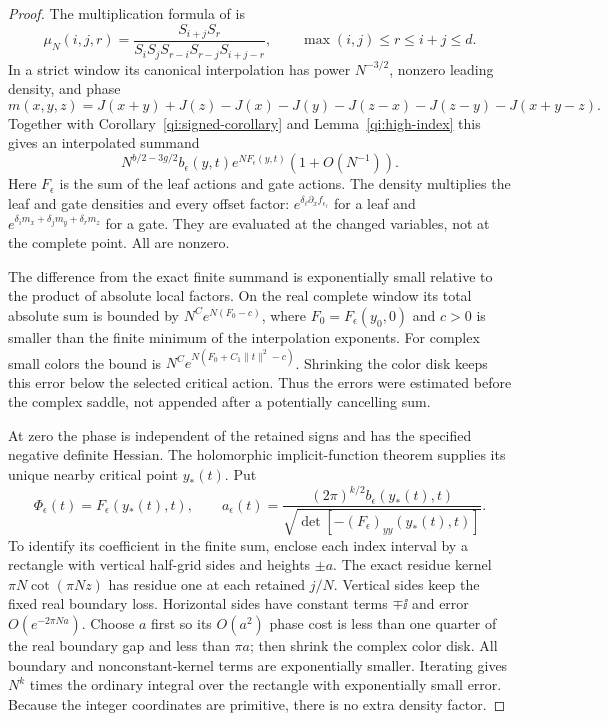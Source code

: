 \begin{proof}
The multiplication formula of \cite[Theorem 3.3]{Newton} is
\[
 \mu_N(i,j,r)=
 \frac{S_{i+j}S_r}{S_iS_jS_{r-i}S_{r-j}S_{i+j-r}},
 \qquad \max(i,j)\le r\le i+j\le d .
\]
In a strict window its canonical interpolation has power $N^{-3/2}$,
nonzero leading density, and phase
\[
 m(x,y,z)=J(x+y)+J(z)-J(x)-J(y)
                  -J(z-x)-J(z-y)-J(x+y-z).
\]
Together with Corollary~\ref{qi:signed-corollary} and
Lemma~\ref{qi:high-index} this gives an interpolated summand
\[
 N^{b/2-3g/2}b_\epsilon(y,t)e^{NF_\epsilon(y,t)}
                         (1+O(N^{-1})).
\]
Here $F_\epsilon$ is the sum of the leaf actions and gate actions. The density multiplies the leaf and gate densities and every offset factor:
$e^{\delta_\ell\partial_xf_{\epsilon_\ell}}$ for a leaf and
$e^{\delta_i m_x+\delta_j m_y+\delta_r m_z}$ for a gate.
They are evaluated at the changed variables, not at the complete point. All are nonzero.

The difference from the exact finite summand is exponentially small relative to the product of absolute local factors. On the real complete window its total absolute sum is bounded by
$N^C e^{N(F_0-c)}$, where $F_0=F_\epsilon(y_0,0)$ and $c>0$ is smaller than the finite minimum of the interpolation exponents. For complex small colors the bound is
$N^C e^{N(F_0+C_1\|t\|^2-c)}$.
Shrinking the color disk keeps this error below the selected critical action. Thus the errors were estimated before the complex saddle, not appended after a potentially cancelling sum.

At zero the phase is independent of the retained signs and has the specified negative definite Hessian. The holomorphic implicit-function theorem supplies its unique nearby critical point $y_*(t)$. Put
\[
 \Phi_\epsilon(t)=F_\epsilon(y_*(t),t),\qquad
 a_\epsilon(t)=
 \frac{(2\pi)^{k/2}b_\epsilon(y_*(t),t)}
 {\sqrt{\det[-(F_\epsilon)_{yy}(y_*(t),t)]}}.
\]
To identify its coefficient in the finite sum, enclose each index interval by a rectangle with vertical half-grid sides and heights $\pm a$. The exact residue kernel $\pi N\cot(\pi Nz)$ has residue one at each retained $j/N$. Vertical sides keep the fixed real boundary loss. Horizontal sides have constant terms $\mp\ii$ and error $O(e^{-2\pi Na})$. Choose $a$ first so its $O(a^2)$ phase cost is less than one quarter of the real boundary gap and less than $\pi a$; then shrink the complex color disk. All boundary and nonconstant-kernel terms are exponentially smaller. Iterating gives $N^k$ times the ordinary integral over the rectangle with exponentially small error. Because the integer coordinates are primitive, there is no extra density factor.


\end{proof}

